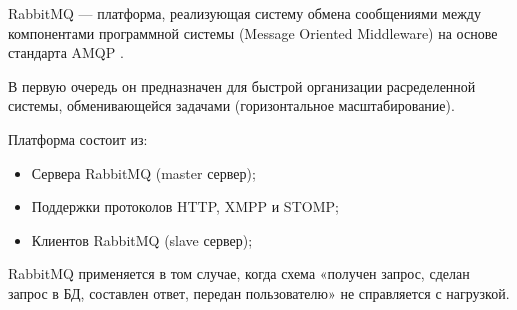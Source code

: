 RabbitMQ --- платформа, реализующая систему обмена сообщениями между компонентами программной системы (Message Oriented Middleware) на основе стандарта AMQP \cite{rabbit_wiki}. 


В первую очередь он предназначен для быстрой организации расределенной системы, обменивающейся задачами (горизонтальное масштабирование). 

Платформа состоит из:

\begin{itemize}
\item Сервера RabbitMQ (master сервер);
\item Поддержки протоколов HTTP, XMPP и STOMP;
\item Клиентов RabbitMQ (slave сервер);
\end{itemize}

RabbitMQ применяется в том случае, когда схема «получен запрос, сделан запрос в БД, составлен ответ, передан пользователю» не справляется с нагрузкой.